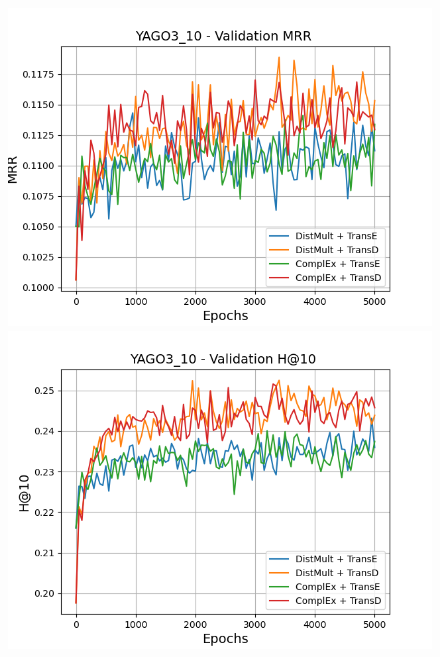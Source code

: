 \begin{figure}[H]
    \centering
    \begin{minipage}{.45\textwidth}
      \centering
      \includegraphics[width=0.9\linewidth]{figures/results/gan_train/pretrained/uncertainty/max_distribution/entropy/yago3_10/5k_epochs/uncertainty_yago3_10_mrrs.png}
    \end{minipage}%
    \begin{minipage}{.45\textwidth}
      \centering
      \includegraphics[width=0.9\linewidth]{figures/results/gan_train/pretrained/uncertainty/max_distribution/entropy/yago3_10/5k_epochs/uncertainty_yago3_10_hit10.png}
    \end{minipage}
    

\end{figure}
